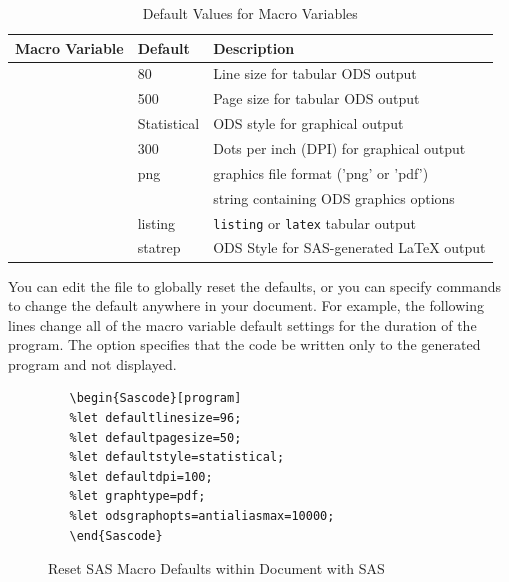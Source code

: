 \documentclass[article,oneside]{memoir}
\begin{document}
  \begin{table}[H]
  \centering\caption{Default Values for Macro Variables}\label{defaults}
  \begin{tabular}{llP{2.5in}}
  \textbf{Macro Variable}    & \textbf{Default} & \textbf{Description}\\
  \hline
      & 80      & Line size for tabular ODS output\\
      & 500     & Page size for tabular ODS output\\
         & Statistical & ODS style for graphical output \\
           & 300      & Dots per inch (DPI) for graphical output\\
            & png      & graphics file format ('png' or 'pdf')\\
         &          & string containing ODS graphics options\\
         & listing  & \texttt{listing} or \texttt{latex} tabular output\\
           & statrep  & ODS Style for SAS-generated LaTeX output\\
  \hline
   \end{tabular}
  \end{table}

  You can edit the  file
  to globally reset the defaults, or you can specify commands to change the default anywhere
  in your document. For example, the following lines change all of the macro variable
  default settings for the duration of the program. The  option specifies
  that the code be written only to the generated program and not displayed.


\begin{figure}[H]
\begin{snugshade}
\begin{verbatim}
   \begin{Sascode}[program]
   %let defaultlinesize=96;
   %let defaultpagesize=50;
   %let defaultstyle=statistical;
   %let defaultdpi=100;
   %let graphtype=pdf;
   %let odsgraphopts=antialiasmax=10000;
   \end{Sascode}
\end{verbatim}
\end{snugshade}
\caption{Reset SAS Macro Defaults within Document with SAS}\label{reset}
\end{figure}
\end{document}
